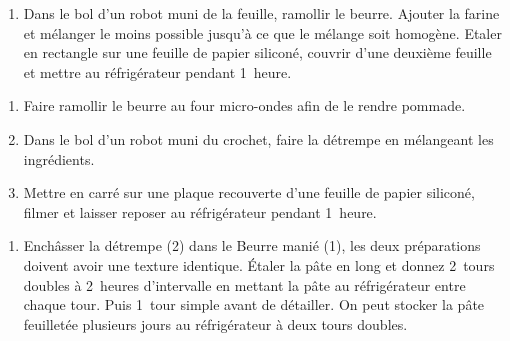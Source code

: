


\begin{ingredients}
\end{ingredients}


\begin{recipe}
  \begin{enumerate}

  \item Dans le bol d’un robot muni de la feuille, ramollir le
    beurre.  Ajouter la farine et mélanger le moins possible jusqu’à ce
    que le mélange soit homogène. Etaler en rectangle sur une feuille
    de papier siliconé, couvrir d’une deuxième feuille et mettre au
    réfrigérateur pendant 1~heure.

  \end{enumerate}
\end{recipe}



\begin{ingredients}
\end{ingredients}


\begin{recipe}
  \begin{enumerate}

  \item Faire ramollir le beurre au four micro-ondes afin de le rendre
    pommade.

  \item Dans le bol d’un robot muni du crochet, faire la détrempe en
    mélangeant les ingrédients.

  \item Mettre en carré sur une plaque recouverte d’une feuille de
    papier siliconé, filmer et laisser reposer au réfrigérateur
    pendant 1~heure.

  \end{enumerate}
\end{recipe}



\begin{recipe}
  \begin{enumerate}

  \item Enchâsser la détrempe (2) dans le Beurre manié (1), les deux
    préparations doivent avoir une texture identique. Étaler la pâte
    en long et donnez 2~tours doubles à 2~heures d'intervalle en
    mettant la pâte au réfrigérateur entre chaque tour. Puis 1~tour
    simple avant de détailler. On peut stocker la pâte feuilletée
    plusieurs jours au réfrigérateur à deux tours doubles.

  \end{enumerate}
\end{recipe}


